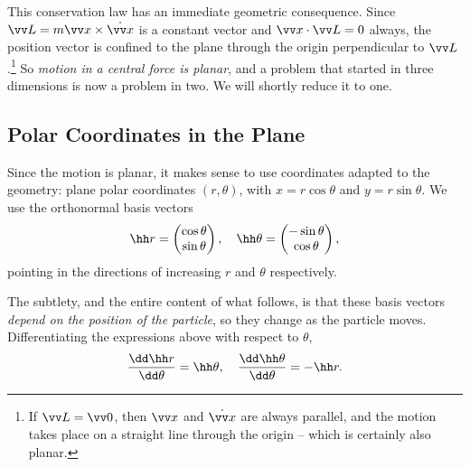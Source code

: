 This conservation law has an immediate geometric consequence. Since $\vv L = m \vv x \times \dot{\vv x}$ is a constant vector and $\vv x \cdot \vv L = 0$ always, the position vector is confined to the plane through the origin perpendicular to $\vv L$.\footnote{If $\vv L = \vv 0$, then $\vv x$ and $\dot{\vv x}$ are always parallel, and the motion takes place on a straight line through the origin -- which is certainly also planar.} So \emph{motion in a central force is planar}, and a problem that started in three dimensions is now a problem in two. We will shortly reduce it to one.

\subsection{Polar Coordinates in the Plane}

Since the motion is planar, it makes sense to use coordinates adapted to the geometry: plane polar coordinates $(r, \theta)$, with $x = r \cos\theta$ and $y = r \sin \theta$. We use the orthonormal basis vectors
$$
\hh r = \begin{pmatrix} \cos \theta \\ \sin\theta\end{pmatrix}, \quad \hh \theta = \begin{pmatrix} -\sin\theta \\ \cos\theta \end{pmatrix},
$$
pointing in the directions of increasing $r$ and $\theta$ respectively.
\begin{center}
\end{center}
The subtlety, and the entire content of what follows, is that these basis vectors \emph{depend on the position of the particle}, so they change as the particle moves. Differentiating the expressions above with respect to $\theta$,
$$
\frac{\dd \hh r}{\dd \theta} = \hh \theta, \quad \frac{\dd \hh \theta}{\dd\theta} = - \hh r.
$$

